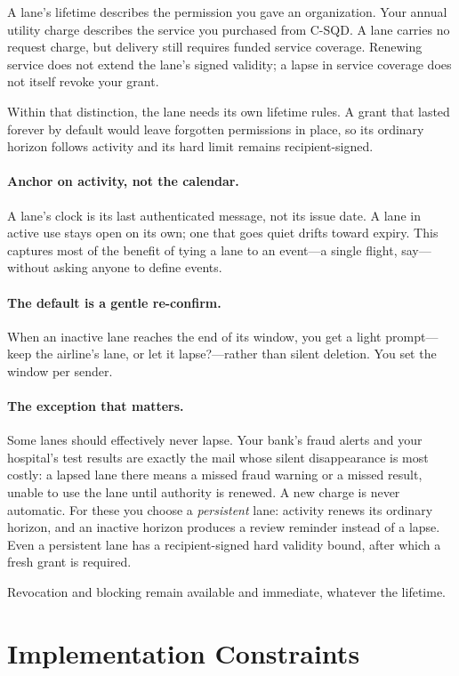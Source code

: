 \documentclass[11pt]{article}
\begin{document}
A lane's lifetime describes the permission you gave an organization. Your annual
utility charge describes the service you purchased from C-SQD. A lane carries no
request charge, but delivery still requires funded service coverage. Renewing
service does not extend the lane's signed validity; a lapse in service coverage
does not itself revoke your grant.

Within that distinction, the lane needs its own lifetime rules. A grant that
lasted forever by default would leave forgotten permissions in place, so its
ordinary horizon follows activity and its hard limit remains recipient-signed.

\paragraph{Anchor on activity, not the calendar.}
A lane's clock is its last authenticated message, not its issue date. A lane in
active use stays open on its own; one that goes quiet drifts toward expiry. This
captures most of the benefit of tying a lane to an event---a single flight,
say---without asking anyone to define events.

\paragraph{The default is a gentle re-confirm.}
When an inactive lane reaches the end of its window, you get a light prompt---keep
the airline's lane, or let it lapse?---rather than silent deletion. You set the
window per sender.

\paragraph{The exception that matters.}
Some lanes should effectively never lapse. Your bank's fraud alerts and your
hospital's test results are exactly the mail whose silent disappearance is most
costly: a lapsed lane there means a missed fraud warning or a missed result,
unable to use the lane until authority is renewed. A new charge is never automatic. For these you choose a \emph{persistent}
lane: activity renews its ordinary horizon, and an inactive horizon produces a
review reminder instead of a lapse. Even a persistent lane has a recipient-signed
hard validity bound, after which a fresh grant is required.

Revocation and blocking remain available and immediate, whatever the lifetime.

\section{Implementation Constraints}
\end{document}
